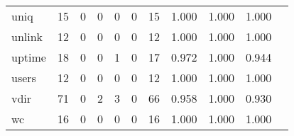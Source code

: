 \begin{longtable}{lp{1.20cm}p{1.20cm}p{1.20cm}p{1.20cm}p{1.20cm}p{1.20cm}p{1.20cm}p{1.20cm}p{1.20cm}p{1.20cm}}
uniq      &                                    15 &                                                  0 &                                                  0 &                                                  0 &                                                  0 &                                                 15 &                                         1.000 &                                              1.000 &                                              1.000 \\
unlink    &                                    12 &                                                  0 &                                                  0 &                                                  0 &                                                  0 &                                                 12 &                                         1.000 &                                              1.000 &                                              1.000 \\
uptime    &                                    18 &                                                  0 &                                                  0 &                                                  1 &                                                  0 &                                                 17 &                                         0.972 &                                              1.000 &                                              0.944 \\
users     &                                    12 &                                                  0 &                                                  0 &                                                  0 &                                                  0 &                                                 12 &                                         1.000 &                                              1.000 &                                              1.000 \\
vdir      &                                    71 &                                                  0 &                                                  2 &                                                  3 &                                                  0 &                                                 66 &                                         0.958 &                                              1.000 &                                              0.930 \\
wc        &                                    16 &                                                  0 &                                                  0 &                                                  0 &                                                  0 &                                                 16 &                                         1.000 &                                              1.000 &                                              1.000 \\

\end{longtable}
